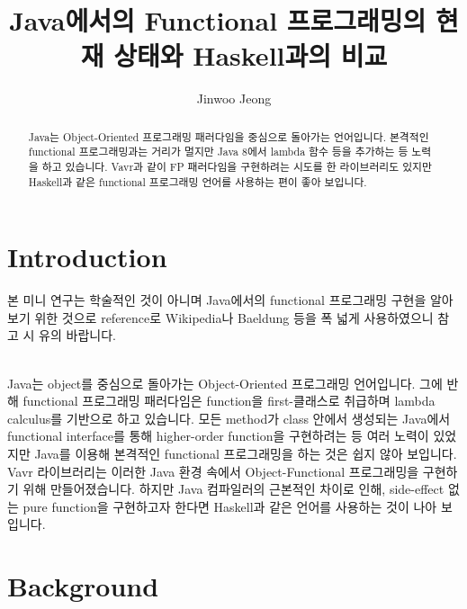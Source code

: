 \documentclass[runningheads]{llncs}
\begin{document}
%
\title{Java에서의 Functional 프로그래밍의 현재 상태와 Haskell과의 비교}
%
%
\author{Jinwoo Jeong}
%
%
%
\maketitle              %
%
\begin{abstract}
Java는 Object-Oriented 프로그래밍 패러다임을 중심으로 돌아가는 언어입니다. 
본격적인 functional 프로그래밍과는 거리가 멀지만 Java 8에서 lambda 함수 등을 추가하는 등 노력을 하고 있습니다.
Vavr과 같이 FP 패러다임을 구현하려는 시도를 한 라이브러리도 있지만 Haskell과 같은 functional 프로그래밍 언어를 사용하는 편이 좋아 보입니다.

\end{abstract}
%
%
%
\section{Introduction}
본 미니 연구는 학술적인 것이 아니며 Java에서의 functional 프로그래밍 구현을 알아보기 위한 것으로
reference로 Wikipedia\cite{ref_wikipedia}나 Baeldung\cite{ref_baeldung} 등을 폭 넓게 사용하였으니 참고 시 유의 바랍니다.

\noindent
\\
Java는 object를 중심으로 돌아가는 Object-Oriented 프로그래밍 언어입니다\cite{ref_wiki_object_oriented_programming}. 
그에 반해 functional 프로그래밍 패러다임은 function을 first-클래스로 취급하며 lambda calculus를 기반으로 하고 있습니다\cite{ref_wiki_functional_programming}.
모든 method가 class 안에서 생성되는 Java에서 functional interface를 통해 higher-order function을 구현하려는 등 여러 노력이 있었지만
Java를 이용해 본격적인 functional 프로그래밍을 하는 것은 쉽지 않아 보입니다. 
Vavr 라이브러리는 이러한 Java 환경 속에서 Object-Functional 프로그래밍\cite{ref_vavr_website}을 구현하기 위해 만들어졌습니다.
하지만 Java 컴파일러의 근본적인 차이로 인해, side-effect 없는 pure function을 구현하고자 한다면 Haskell과 같은 언어를 사용하는 것이 나아 보입니다.

\section{Background}
\end{document}
